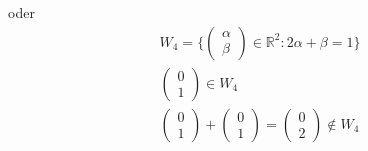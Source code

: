 \documentclass[11pt]{report}
\newcommand*\Zb[1] {\mathbb{#1}}
\begin{document}
oder
\begin{align}
W_4 = \{\begin{pmatrix} \alpha \\ \beta \end{pmatrix} \in \Zb{R}^2: 2\alpha + \beta = 1\} \\
\begin{pmatrix} 0 \\ 1 \end{pmatrix} \in W_4 \\
 \begin{pmatrix} 0 \\ 1 \end{pmatrix} + \begin{pmatrix} 0 \\ 1 \end{pmatrix} = \begin{pmatrix} 0 \\ 2 \end{pmatrix} \notin W_4
\end{align}
\end{document}
